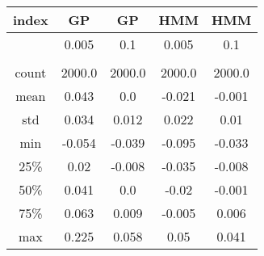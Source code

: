 \centering \begin{tabular}{c|c|c|c|c}
index	&GP	&GP	&HMM	&HMM\\\hline
	&0.005	&0.1	&0.005	&0.1\\
	&	&	&	&\\
count	&2000.0	&2000.0	&2000.0	&2000.0\\
mean	&0.043	&0.0	&-0.021	&-0.001\\
std	&0.034	&0.012	&0.022	&0.01\\
min	&-0.054	&-0.039	&-0.095	&-0.033\\
25\%	&0.02	&-0.008	&-0.035	&-0.008\\
50\%	&0.041	&0.0	&-0.02	&-0.001\\
75\%	&0.063	&0.009	&-0.005	&0.006\\
max	&0.225	&0.058	&0.05	&0.041\\
\end{tabular}
